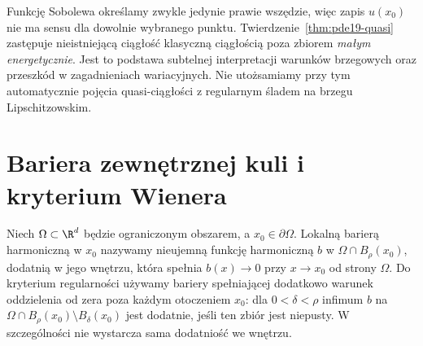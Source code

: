 \begin{uwaga}
Funkcję Sobolewa określamy zwykle jedynie prawie wszędzie,
więc zapis $u(x_0)$ nie ma sensu dla dowolnie wybranego
punktu. Twierdzenie~\ref{thm:pde19-quasi} zastępuje
nieistniejącą ciągłość klasyczną ciągłością poza zbiorem
\emph{małym energetycznie}. Jest to podstawa subtelnej
interpretacji warunków brzegowych oraz przeszkód w zagadnieniach
wariacyjnych. Nie utożsamiamy przy tym automatycznie
pojęcia quasi-ciągłości z regularnym śladem na
brzegu Lipschitzowskim.
\end{uwaga}

\section{Bariera zewnętrznej kuli i kryterium Wienera}
\label{sec:pde19-wiener}
\begin{definicja}
Niech $\Omega\subset\R^d$ będzie ograniczonym obszarem,
a $x_0\in\partial\Omega$. Lokalną barierą harmoniczną
w $x_0$ nazywamy nieujemną funkcję harmoniczną $b$
w $\Omega\cap B_\rho(x_0)$, dodatnią w jego wnętrzu,
która spełnia $b(x)\to0$ przy $x\to x_0$ od strony $\Omega$.
Do kryterium regularności używamy bariery spełniającej
dodatkowo warunek oddzielenia od zera poza każdym
otoczeniem $x_0$: dla $0<\delta<\rho$ infimum $b$
na $\Omega\cap B_\rho(x_0)\setminus B_\delta(x_0)$
jest dodatnie, jeśli ten zbiór jest niepusty.
W szczególności nie wystarcza sama dodatniość
we wnętrzu.
\end{definicja}

